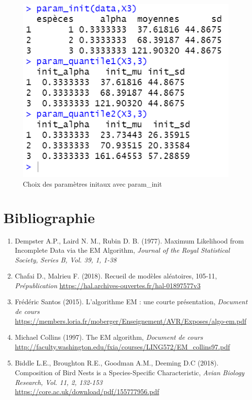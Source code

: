 \documentclass[11pt]{beamer}
\begin{document}
	\begin{frame}
		\begin{figure}[H]
			\centering
			\includegraphics[scale=0.7]{images/param_init_image.png}
			\caption{Choix des paramètres initaux avec param\_init}
		\end{figure}
	\end{frame}

	\section{Bibliographie}

	\begin{frame}
		\scriptsize
		\begin{enumerate}
		\item Dempster A.P., Laird N. M., Rubin D. B. (1977). Maximum Likelihood from Incomplete Data via the EM Algorithm, \textit{Journal of the Royal Statistical Society, Series B, Vol. 39, 1, 1-38}

		\item Chafai D., Malrieu F. (2018). Recueil de modèles aléatoires, 105-11, \textit{Prépublication}\newline
\url{https://hal.archives-ouvertes.fr/hal-01897577v3}

		\item Frédéric Santos (2015). L’algorithme EM : une courte présentation, \textit{Document de cours}
\newline\url{https://members.loria.fr/moberger/Enseignement/AVR/Exposes/algo-em.pdf} 

		\item Michael Collins (1997). The EM algorithm, \textit{Document de cours}\newline
\url{http://faculty.washington.edu/fxia/courses/LING572/EM_collins97.pdf} 

		\item Biddle L.E., Broughton R.E., Goodman A.M., Deeming D.C (2018). Composition of Bird Nests is a Species-Specific Characteristic, \textit{Avian Biology Research, Vol. 11, 2, 132-153}\newline
\url{https://core.ac.uk/download/pdf/155777956.pdf}
		\end{enumerate}
	\end{frame}
\end{document}
